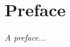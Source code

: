 \chapter*{Preface}

\emph{A preface...}

\begin{flushright}
{\makeatletter\itshape
    \@author \\
    \monthname{} \the\year{}
\makeatother}
\end{flushright}
